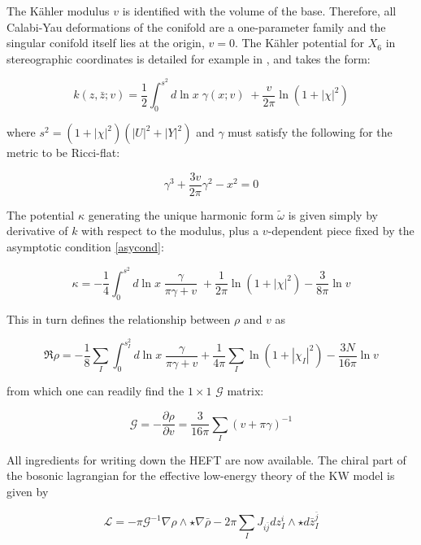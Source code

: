 The K\"ahler modulus $v$ is identified with the volume of the base. Therefore, all Calabi-Yau deformations of the conifold are a one-parameter family and the singular conifold itself lies at the origin, $v=0$. The K\"ahler potential for $X_6$ in stereographic coordinates is detailed for example in \cite{PandoZayas}, and takes the form:

\begin{equation}
	k(z,\bar z; v) = \frac{1}{2} \int_0^{s^2} d\ln x \; \gamma(x;v) \; + \frac{v}{2\pi} \ln(1+|\chi|^2)
	\label{}
\end{equation}

where $s^2 = (1+|\chi|^2)(|U|^2 + |Y|^2)$ and $\gamma$ must satisfy the following for the metric to be Ricci-flat:

\begin{equation}
	\gamma^3 + \frac{3v}{2\pi} \gamma^2 - x^2 = 0
	\label{}
\end{equation}

The potential $\kappa$ generating the unique harmonic form $\tilde\omega$ is given simply by derivative of $k$ with respect to the modulus, plus a $v$-dependent piece fixed by the asymptotic condition \ref{asycond}:

\begin{equation}
	\kappa = -\frac{1}{4} \int_0^{s^2} d\ln x \; \frac{\gamma}{\pi\gamma+v} \; + \frac{1}{2\pi} \ln(1+ |\chi|^2) - \frac{3}{8\pi}\ln v
	\label{}
\end{equation}

This in turn defines the relationship between $\rho$ and $v$ as

\begin{equation}
	\Re \rho = - \frac{1}{8} \sum_I \int_0^{s_I^2} d\ln x \; \frac{\gamma}{\pi\gamma + v} + \frac{1}{4\pi}\sum_I \ln(1+|\chi_I|^2) - \frac{3N}{16\pi} \ln v
\end{equation}

from which one can readily find the $1\times1$ $\mathcal{G}$ matrix:

\begin{equation}
	\mathcal{G} = - \frac{\partial \rho}{\partial v} = \frac{3}{16\pi}\sum_I (v+\pi\gamma)^{-1}
	\label{}
\end{equation}

All ingredients for writing down the HEFT are now available. The chiral part of the bosonic lagrangian for the effective low-energy theory of the KW model is given by

\begin{equation}
	\mathcal{L} = - \pi \mathcal{G}^{-1} \nabla \rho \wedge \star \nabla \bar \rho - 2\pi \sum_I J_{i\bar j} dz_I^i \wedge \star d\bar z_I^{\bar j} 
	\label{}
\end{equation}

